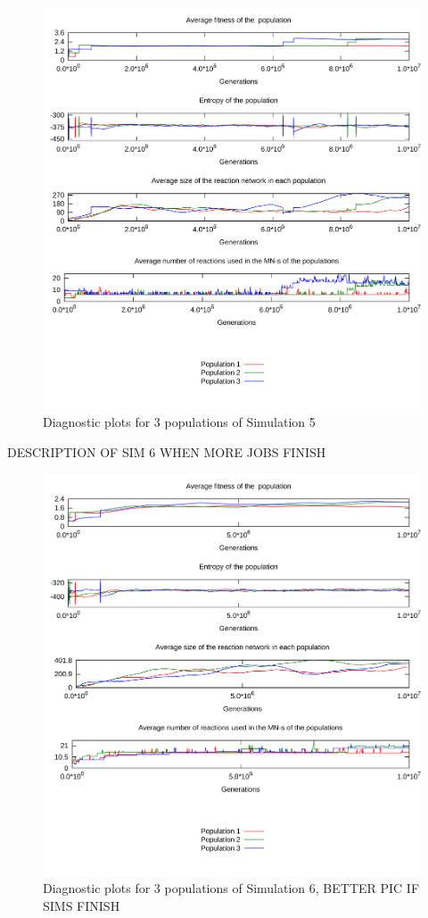 \documentclass[a4paper,12pt]{article}
\begin{document}
\begin{figure}[htpb]
	\centering
	\includegraphics[width=0.8\linewidth]{simulationpyruvonly.pdf}
	\caption{Diagnostic plots for 3 populations of Simulation 5}
	\label{fig:simulationpyruvonly}
\end{figure}

DESCRIPTION OF SIM 6 WHEN MORE JOBS FINISH
\begin{figure}[htpb]
	\centering
	\includegraphics[width=0.8\linewidth]{simulationequalatppyruvate.pdf}
	\caption{Diagnostic plots for 3 populations of Simulation 6, BETTER PIC IF SIMS FINISH}
	\label{fig:simulationequalatppyruvate}
\end{figure}
\end{document}
